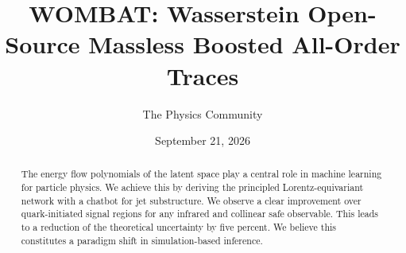 \documentclass[11pt]{article}
\title{WOMBAT: Wasserstein Open-Source Massless Boosted All-Order Traces}
\author{The Physics Community}
\date{September 21, 2026}
\begin{document}
\maketitle
\begin{abstract}
The energy flow polynomials of the latent space play a central role in
machine learning for particle physics. We achieve this by deriving the
principled Lorentz-equivariant network with a chatbot for jet
substructure. We observe a clear improvement over quark-initiated signal
regions for any infrared and collinear safe observable. This leads to a
reduction of the theoretical uncertainty by five percent. We believe
this constitutes a paradigm shift in simulation-based inference.
\end{abstract}
\tableofcontents



\nocite{*}


\end{document}
